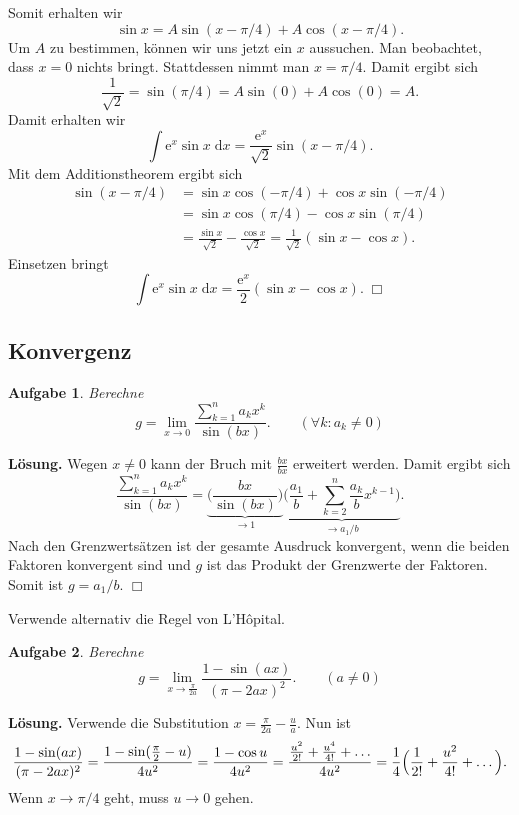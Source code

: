 \documentclass[a4paper,10pt,fleqn,twoside]{scrartcl}
\numberwithin{equation}{section}
\newcommand{\ee}{\mathrm e}
\newcommand{\strong}[1]{{\sf\bfseries #1}}
\theoremstyle{Aufgabe}
\newtheorem{Aufgabe}{\sffamily Aufgabe}[section]
\begin{document}
Somit erhalten wir
\begin{equation}
\sin x = A\sin (x-\pi/4)+A\cos(x-\pi/4).
\end{equation}
Um $A$ zu bestimmen, können wir uns jetzt ein $x$ aussuchen.
Man beobachtet, dass $x=0$ nichts bringt. Stattdessen nimmt
man $x=\pi/4$. Damit ergibt sich
\begin{equation}
\frac{1}{\sqrt{2}} = \sin(\pi/4) = A\sin(0)+A\cos(0) = A.
\end{equation}
Damit erhalten wir
\begin{equation}
\int \ee^x\sin x\;\mathrm dx = \frac{\ee^x}{\sqrt{2}}\sin(x-\pi/4).
\end{equation}
Mit dem Additionstheorem ergibt sich
\begin{align}
\sin(x-\pi/4) &= \sin x\cos(-\pi/4)+\cos x\sin(-\pi/4)\\
&= \sin x\cos(\pi/4)-\cos x\sin(\pi/4)\\
&= \frac{\sin x}{\sqrt{2}}-\frac{\cos x}{\sqrt{2}}
= \frac{1}{\sqrt{2}}(\sin x-\cos x).
\end{align}
Einsetzen bringt
\begin{equation}
\int \ee^x\sin x\;\mathrm dx = \frac{\ee^x}{2}(\sin x-\cos x).\;\Box
\end{equation}


\subsection{Konvergenz}
\begin{Aufgabe}
Berechne
\[g = \lim_{x\to 0}\frac{\sum_{k=1}^n a_k x^k}{\sin(bx)}.
\qquad(\forall k\colon a_k\ne 0)\]
\end{Aufgabe}
\noindent
\strong{Lösung.}
Wegen $x\ne 0$ kann der Bruch mit $\frac{bx}{bx}$ erweitert
werden. Damit ergibt sich
\[\frac{\sum_{k=1}^n a_k x^k}{\sin(bx)}
= \underbrace{\bigg(\frac{bx}{\sin(bx)}\bigg)}_{\to 1}
\underbrace{\bigg(\frac{a_1}{b}+\sum_{k=2}^n\frac{a_k}{b}x^{k-1}\bigg)}_{\to a_1/b}.
\]
Nach den Grenzwertsätzen ist der gesamte Ausdruck konvergent, wenn
die beiden Faktoren konvergent sind und $g$ ist das Produkt
der Grenzwerte der Faktoren. Somit ist $g=a_1/b$. $\Box$

Verwende alternativ die Regel von L'Hôpital.

\begin{Aufgabe}
Berechne
\[g = \lim_{x\to\frac{\pi}{2a}} \frac{1-\sin(ax)}{(\pi-2ax)^2}.
\qquad(a\ne 0)\]
\end{Aufgabe}
\noindent
\strong{Lösung.}
Verwende die Substitution $x=\frac{\pi}{2a}-\frac{u}{a}$.
Nun ist
\[
\frac{1-\sin(ax)}{(\pi-2ax)^2}
= \frac{1-\sin(\frac{\pi}{2}-u)}{4u^2}
= \frac{1-\cos u}{4u^2}\\
= \frac{\frac{u^2}{2!}+\frac{u^4}{4!}+\ldots}{4u^2}
= \frac{1}{4} \Big(\frac{1}{2!}+\frac{u^2}{4!}+\ldots\Big).
\]
Wenn $x\to\pi/4$ geht, muss $u\to 0$ gehen.
\end{document}
